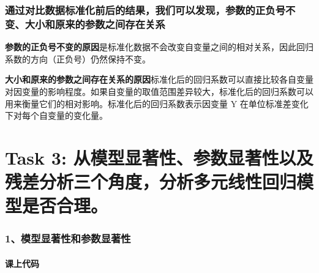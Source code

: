 \documentclass[11pt]{article}
\begin{document}
    \hypertarget{ux901aux8fc7ux5bf9ux6bd4ux6570ux636eux6807ux51c6ux5316ux524dux540eux7684ux7ed3ux679cux6211ux4eecux53efux4ee5ux53d1ux73b0ux53c2ux6570ux7684ux6b63ux8d1fux53f7ux4e0dux53d8ux5927ux5c0fux548cux539fux6765ux7684ux53c2ux6570ux4e4bux95f4ux5b58ux5728ux5173ux7cfb}{%
\subsubsection{通过对比数据标准化前后的结果，我们可以发现，参数的正负号不变、大小和原来的参数之间存在关系}\label{ux901aux8fc7ux5bf9ux6bd4ux6570ux636eux6807ux51c6ux5316ux524dux540eux7684ux7ed3ux679cux6211ux4eecux53efux4ee5ux53d1ux73b0ux53c2ux6570ux7684ux6b63ux8d1fux53f7ux4e0dux53d8ux5927ux5c0fux548cux539fux6765ux7684ux53c2ux6570ux4e4bux95f4ux5b58ux5728ux5173ux7cfb}}

\textbf{参数的正负号不变的原因}是标准化数据不会改变自变量之间的相对关系，因此回归系数的方向（正负号）仍然保持不变。

\textbf{大小和原来的参数之间存在关系的原因}标准化后的回归系数可以直接比较各自变量对因变量的影响程度。如果自变量的取值范围差异较大，标准化后的回归系数可以用来衡量它们的相对影响。标准化后的回归系数表示因变量
Y 在单位标准差变化下对每个自变量的变化量。

    \hypertarget{task-3-ux4eceux6a21ux578bux663eux8457ux6027ux53c2ux6570ux663eux8457ux6027ux4ee5ux53caux6b8bux5deeux5206ux6790ux4e09ux4e2aux89d2ux5ea6ux5206ux6790ux591aux5143ux7ebfux6027ux56deux5f52ux6a21ux578bux662fux5426ux5408ux7406}{%
\section{Task 3:
从模型显著性、参数显著性以及残差分析三个角度，分析多元线性回归模型是否合理。}\label{task-3-ux4eceux6a21ux578bux663eux8457ux6027ux53c2ux6570ux663eux8457ux6027ux4ee5ux53caux6b8bux5deeux5206ux6790ux4e09ux4e2aux89d2ux5ea6ux5206ux6790ux591aux5143ux7ebfux6027ux56deux5f52ux6a21ux578bux662fux5426ux5408ux7406}}

    \hypertarget{ux6a21ux578bux663eux8457ux6027ux548cux53c2ux6570ux663eux8457ux6027}{%
\subsubsection{1、模型显著性和参数显著性}\label{ux6a21ux578bux663eux8457ux6027ux548cux53c2ux6570ux663eux8457ux6027}}

    \hypertarget{ux8bfeux4e0aux4ee3ux7801}{%
\paragraph{课上代码}\label{ux8bfeux4e0aux4ee3ux7801}}
\end{document}
